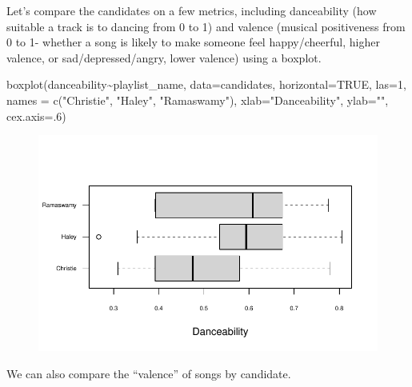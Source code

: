 \documentclass[
  letterpaper,
  DIV=11,
  numbers=noendperiod]{scrreprt}
\newenvironment{Shaded}{\begin{snugshade}}{\end{snugshade}}
\newcommand{\AttributeTok}[1]{\textcolor[rgb]{0.40,0.45,0.13}{#1}}
\newcommand{\ConstantTok}[1]{\textcolor[rgb]{0.56,0.35,0.01}{#1}}
\newcommand{\DecValTok}[1]{\textcolor[rgb]{0.68,0.00,0.00}{#1}}
\newcommand{\FunctionTok}[1]{\textcolor[rgb]{0.28,0.35,0.67}{#1}}
\newcommand{\NormalTok}[1]{\textcolor[rgb]{0.00,0.23,0.31}{#1}}
\newcommand{\SpecialCharTok}[1]{\textcolor[rgb]{0.37,0.37,0.37}{#1}}
\newcommand{\StringTok}[1]{\textcolor[rgb]{0.13,0.47,0.30}{#1}}
\begin{document}
Let's compare the candidates on a few metrics, including danceability
(how suitable a track is to dancing from 0 to 1) and valence (musical
positiveness from 0 to 1- whether a song is likely to make someone feel
happy/cheerful, higher valence, or sad/depressed/angry, lower valence)
using a boxplot.

\begin{Shaded}
\begin{Highlighting}[]
\FunctionTok{boxplot}\NormalTok{(danceability}\SpecialCharTok{\textasciitilde{}}\NormalTok{playlist\_name, }\AttributeTok{data=}\NormalTok{candidates, }\AttributeTok{horizontal=}\ConstantTok{TRUE}\NormalTok{, }\AttributeTok{las=}\DecValTok{1}\NormalTok{, }
        \AttributeTok{names =} \FunctionTok{c}\NormalTok{(}\StringTok{"Christie"}\NormalTok{, }\StringTok{"Haley"}\NormalTok{,}
                                                                                \StringTok{"Ramaswamy"}\NormalTok{), }
        \AttributeTok{xlab=}\StringTok{"Danceability"}\NormalTok{, }\AttributeTok{ylab=}\StringTok{""}\NormalTok{,}
        \AttributeTok{cex.axis=}\NormalTok{.}\DecValTok{6}\NormalTok{)}
\end{Highlighting}
\end{Shaded}

\begin{figure}[H]

{\centering \includegraphics{11-TextasData_files/figure-pdf/unnamed-chunk-29-1.pdf}

}

\end{figure}

We can also compare the ``valence'' of songs by candidate.
\end{document}
